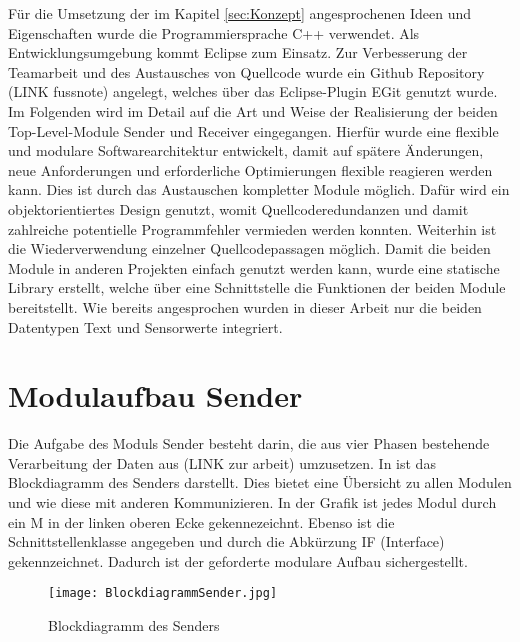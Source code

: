 
Für die Umsetzung der im Kapitel \ref{sec:Konzept} angesprochenen Ideen und
Eigenschaften wurde die Programmiersprache C++ verwendet. Als Entwicklungsumgebung kommt
Eclipse zum Einsatz. Zur Verbesserung der Teamarbeit und des Austausches
von Quellcode wurde ein Github Repository (LINK fussnote) angelegt, welches über
das Eclipse-Plugin EGit genutzt wurde. \newline 
Im Folgenden wird im Detail auf die Art und Weise der Realisierung
der beiden Top-Level-Module Sender und Receiver eingegangen. Hierfür wurde
eine flexible und modulare Softwarearchitektur entwickelt, damit auf
spätere Änderungen, neue Anforderungen und erforderliche Optimierungen flexible
reagieren werden kann. Dies ist durch das Austauschen kompletter Module möglich.
Dafür wird ein objektorientiertes Design genutzt, womit Quellcoderedundanzen und damit
zahlreiche potentielle Programmfehler vermieden werden konnten.
Weiterhin ist die Wiederverwendung einzelner Quellcodepassagen möglich.\newline
Damit die beiden Module in anderen Projekten einfach genutzt werden kann, wurde
eine statische Library erstellt, welche über eine Schnittstelle die Funktionen
der beiden Module bereitstellt. Wie bereits angesprochen wurden in dieser Arbeit
nur die beiden Datentypen Text und Sensorwerte integriert.

\section{Modulaufbau Sender}

Die Aufgabe des Moduls Sender besteht darin, die aus vier Phasen bestehende
Verarbeitung der Daten aus (LINK zur arbeit) umzusetzen. In
 ist das Blockdiagramm des Senders darstellt.
Dies bietet eine Übersicht zu allen Modulen und wie diese mit anderen
Kommunizieren. In der Grafik ist jedes Modul durch ein M in der linken oberen
Ecke gekennezeichnt. Ebenso ist die Schnittstellenklasse angegeben und durch die
Abkürzung IF (Interface) gekennzeichnet. Dadurch ist der geforderte modulare
Aufbau sichergestellt.

\begin{figure}[htb]
\centering
\texttt{[image: BlockdiagrammSender.jpg]} %
\caption{Blockdiagramm des Senders}
\label{fig:BlockdiagrammSender}
\end{figure}

